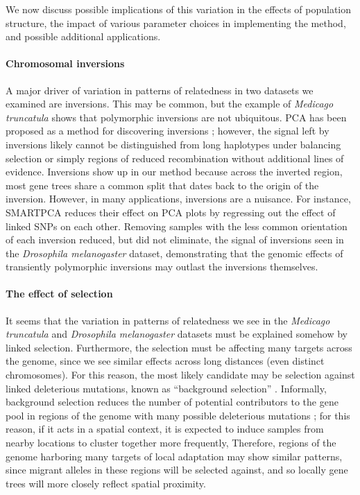 \documentclass[11pt, oneside]{article}   	%
\begin{document}
We now discuss possible implications of this variation in the effects of population structure,
the impact of various parameter choices in implementing the method,
and possible additional applications.


\paragraph{Chromosomal inversions}
A major driver of variation in patterns of relatedness in two datasets we examined are inversions.
This may be common,
but the example of \textit{Medicago truncatula} shows that polymorphic inversions are not ubiquitous.
PCA has been proposed as a method for discovering inversions \citep{ma2012investigation};
however, the signal left by inversions likely cannot be distinguished from long haplotypes under balancing selection 
or simply regions of reduced recombination
without additional lines of evidence.
Inversions show up in our method because across the inverted region,
most gene trees share a common split that dates back to the origin of the inversion.
However, in many applications, inversions are a nuisance.
For instance, SMARTPCA \citep{patterson2006population} reduces their effect on PCA plots
by regressing out the effect of linked SNPs on each other.
Removing samples with the less common orientation of each inversion reduced,
but did not eliminate, the signal of inversions
seen in the \textit{Drosophila melanogaster} dataset,
demonstrating that the genomic effects of transiently polymorphic inversions
may outlast the inversions themselves.


\paragraph{The effect of selection}
It seems that
the variation in patterns of relatedness we see in the \textit{Medicago truncatula} and \textit{Drosophila melanogaster} datasets
must be explained somehow by linked selection.
Furthermore, 
the selection must be affecting many targets across the genome,
since we see similar effects across long distances (even distinct chromosomes).
For this reason, the most likely candidate may be selection against linked deleterious mutations, known as ``background selection'' \citep{charlesworth1993effect,charlesworth2013background}.
Informally, background selection reduces the number of potential contributors to the gene pool 
in regions of the genome with many possible deleterious mutations \citep{hudson1995deleterious};
for this reason, if it acts in a spatial context, it is expected to induce samples from nearby locations to cluster together more frequently,
Therefore, regions of the genome harboring many targets of local adaptation may show similar patterns,
since migrant alleles in these regions will be selected against,
and so locally gene trees will more closely reflect spatial proximity.
\end{document}
